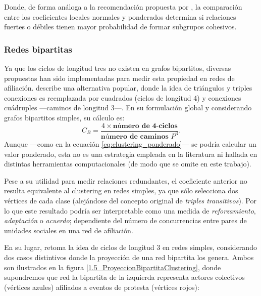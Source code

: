 \documentclass[letterpaper, 11pt]{book}
\theoremstyle{definition}
\theoremstyle{remark}
\begin{document}
Donde, de forma análoga a la recomendación propuesta por \citet{2009_Clustering_Opsahl}, la comparación entre los coeficientes locales normales y ponderados determina si relaciones fuertes o débiles tienen mayor probabilidad de formar subgrupos cohesivos. 





\subsubsection{Redes bipartitas}
\label{sec:clustering_Vbipartita}

Ya que los ciclos de longitud tres no existen en grafos bipartitos, diversas propuestas han sido implementadas para medir esta propiedad en redes de afiliación. 
\citet{2013_Opsahl_BipartiteCluster} describe una alternativa popular, donde la idea de triángulos y triples conexiones es reemplazada por cuadrados (ciclos de longitud 4) y conexiones cuádruples ---caminos de longitud 3---. 
En su formulación global y considerando grafos bipartitos simples, su cálculo es:
\begin{equation}\label{eq:clustering_bipartito_ponderado}
    C_{B} = 
    \frac{4 \times \textbf{número de 4-ciclos}}{\textbf{número de caminos } P^{3}}.
\end{equation}
Aunque ---como en la ecuación \ref{eq:clustering_ponderado}--- se podría calcular un valor ponderado, esta no es una estrategia empleada en la literatura ni hallada en distintas herramientas computacionales (de modo que se omite en este trabajo). 


Pese a su utilidad para medir relaciones redundantes, el coeficiente anterior no resulta equivalente al clustering en redes simples, ya que sólo selecciona dos vértices de cada clase (alejándose del concepto original de \emph{triples transitivos}). 
Por lo que este resultado podría ser interpretable como una medida de \emph{reforzamiento}, \emph{adaptación} o \emph{acuerdo}; dependiente del número de concurrencias entre pares de unidades sociales en una red de afiliación. 


En su lugar, \citet{2013_Opsahl_BipartiteCluster} retoma la idea de ciclos de longitud 3 en redes simples, considerando dos casos distintivos donde la proyección de una red bipartita los genera. 
Ambos son ilustrados en la figura \ref{1.5_ProyeccionBipartitaClustering}, donde supondremos que red la bipartita de la izquierda representa actores colectivos (vértices azules) afiliados a eventos de protesta (vértices rojos): 
\end{document}
